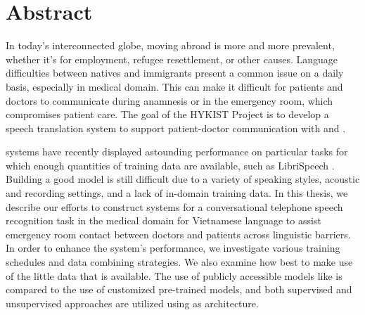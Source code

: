 \chapter{Abstract}
\label{ch: Abstract}

In today's interconnected globe, moving abroad is more and more prevalent, whether it's for employment, refugee resettlement, or other causes.
Language difficulties between natives and immigrants present a common issue on a daily basis, especially in medical domain.
This can make it difficult for patients and doctors to communicate during anamnesis or in the emergency room, which compromises patient care. 
The goal of the HYKIST Project is to develop a speech translation system to support patient-doctor communication with  and .

 systems have recently displayed astounding performance on particular tasks for which enough quantities of training data are available, such as LibriSpeech \cite{panayotov2015librispeech}.
Building a good model is still difficult due to a variety of speaking styles, acoustic and recording settings, and a lack of in-domain training data.
In this thesis, we describe our efforts to construct  systems for a conversational telephone speech recognition task in the medical domain for Vietnamese language to assist emergency room contact between doctors and patients across linguistic barriers.
In order to enhance the system's performance, we investigate various training schedules and data combining strategies. We also examine how best to make use of the little data that is available. 
The use of publicly accessible models like  \cite{xlsr53} is compared to the use of customized pre-trained models, and both supervised and unsupervised approaches are utilized using  \cite{wav2vec2} as architecture.

\clearpage